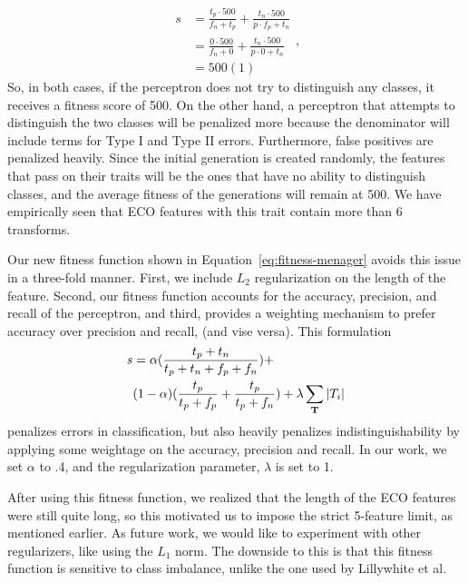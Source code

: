 \documentclass[conference]{IEEEtran}
\begin{document}
\begin{equation}
  \begin{split}
    s & = \frac{t_p \cdot 500}{f_n + t_p} + \frac{t_n \cdot 500}{p \cdot f_p+ t_n}\\
    & = \frac{0 \cdot 500}{f_n + 0} + \frac{t_n \cdot 500}{p \cdot 0 + t_n}\\
    & = 500(1)
  \end{split},
  \label{eq:fitness-lilly-decompose2}
\end{equation}
So, in both cases, if the perceptron does not try to distinguish any classes, it receives a fitness score of 500. On the other hand, a perceptron that attempts to distinguish the two classes will be penalized more because the denominator will include terms for Type I and Type II errors. Furthermore, false positives are penalized heavily. Since the initial generation is created randomly, the features that pass on their traits will be the ones that have no ability to distinguish classes, and the average fitness of the generations will remain at 500. We have empirically seen that ECO features with this trait contain more than 6 transforms.

Our new fitness function shown in Equation~\ref{eq:fitness-menager} avoids this issue in a three-fold manner. First, we include $L_2$ regularization on the length of the feature. Second, our fitness function accounts for the accuracy, precision, and recall of the perceptron, and third, provides a weighting mechanism to prefer accuracy over precision and recall, (and vise versa). This formulation
\begin{equation}
  \begin{split}
    s & = \alpha(\frac{t_p + t_n}{t_p + t_n + f_p + f_n}) +\\
    &(1 - \alpha)(\frac{t_p}{t_p + f_p} + \frac{t_p}{t_p + f_n}) + \lambda \sum_{\bf T} |T_i|
    \end{split}
  \label{eq:fitness-menager}
\end{equation}
penalizes errors in classification, but also heavily penalizes indistinguishability by applying some weightage on the accuracy, precision and recall. In our work, we set $\alpha$ to .4, and the regularization parameter, $\lambda$ is set to 1.

After using this fitness function, we realized that the length of the ECO features were still quite long, so this motivated us to impose the strict 5-feature limit, as mentioned earlier. As future work, we would like to experiment with other regularizers, like using the $L_1$ norm. The downside to this is that this fitness function is sensitive to class imbalance, unlike the one used by Lillywhite et al. 
\end{document}
